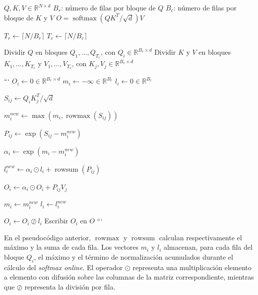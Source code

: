 \begin{algorithm}[H]
\caption{FlashAttention 2}
\label{alg:flashattention2}
\begin{algorithmic}[1]

\Require \(Q,K,V \in \mathbb{R}^{N\times d}\)
\Require \(B_r\): número de filas por bloque de \(Q\)
\Require \(B_c\): número de filas por bloque de \(K\) y \(V\)
\Ensure \(O = \operatorname{softmax}(QK^T/\sqrt{d})V\)

\State \(T_r \gets \lceil N/B_r \rceil\)
\State \(T_c \gets \lceil N/B_c \rceil\)

\State Dividir \(Q\) en bloques \(Q_1,\ldots,Q_{T_r}\), con \(Q_i \in \mathbb{R}^{B_r\times d}\)
\State Dividir \(K\) y \(V\) en bloques \(K_1,\ldots,K_{T_c}\) y \(V_1,\ldots,V_{T_c}\), con \(K_j,V_j \in \mathbb{R}^{B_c\times d}\)


```
\State \(O_i \gets 0 \in \mathbb{R}^{B_r\times d}\)
\State \(m_i \gets -\infty \in \mathbb{R}^{B_r}\)
\State \(l_i \gets 0 \in \mathbb{R}^{B_r}\)


    \State \(S_{ij} \gets Q_iK_j^T/\sqrt{d}\)

    \State \(m_i^{new}
    \gets
    \max\left(
        m_i,
        \operatorname{rowmax}(S_{ij})
    \right)\)

    \State \(P_{ij}
    \gets
    \exp\left(
        S_{ij}-m_i^{new}
    \right)\)

    \State \(\alpha_i
    \gets
    \exp\left(
        m_i-m_i^{new}
    \right)\)

    \State \(l_i^{new}
    \gets
    \alpha_i \odot l_i
    +
    \operatorname{rowsum}(P_{ij})\)

    \State \(O_i
    \gets
    \alpha_i \odot O_i
    +
    P_{ij}V_j\)

    \State \(m_i \gets m_i^{new}\)
    \State \(l_i \gets l_i^{new}\)

\EndFor

\State \(O_i \gets O_i \oslash l_i\)
\State Escribir \(O_i\) en \(O\)
```

\EndFor

\end{algorithmic}
\end{algorithm}

En el pseudocódigo anterior, \(\operatorname{rowmax}\) y \(\operatorname{rowsum}\) calculan respectivamente el máximo y la suma de cada fila. Los vectores \(m_i\) y \(l_i\) almacenan, para cada fila del bloque \(Q_i\), el máximo y el término de normalización acumulados durante el cálculo del \textit{softmax online}. El operador \(\odot\) representa una multiplicación elemento a elemento con difusión sobre las columnas de la matriz correspondiente, mientras que \(\oslash\) representa la división por fila.

